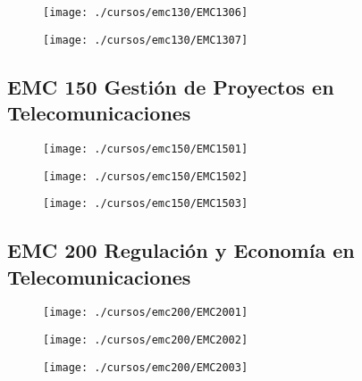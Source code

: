 \begin{figure}[!ht]
    \centering
    \texttt{[image: ./cursos/emc130/EMC1306]}
\end{figure}
\clearpage

\begin{figure}[!ht]
    \centering
    \texttt{[image: ./cursos/emc130/EMC1307]}
\end{figure}
\clearpage



\subsection{EMC 150 Gestión de Proyectos en Telecomunicaciones} 



\begin{figure}[!ht]
    \centering
    \texttt{[image: ./cursos/emc150/EMC1501]}
\end{figure}
\clearpage

\begin{figure}[!ht]
    \centering
    \texttt{[image: ./cursos/emc150/EMC1502]}
\end{figure}
\clearpage

\begin{figure}[!ht]
    \centering
    \texttt{[image: ./cursos/emc150/EMC1503]}
\end{figure}
\clearpage


\subsection{EMC 200 Regulación y Economía en Telecomunicaciones}




\begin{figure}[!ht]
    \centering
    \texttt{[image: ./cursos/emc200/EMC2001]}
\end{figure}
\clearpage

\begin{figure}[!ht]
    \centering
    \texttt{[image: ./cursos/emc200/EMC2002]}
\end{figure}
\clearpage

\begin{figure}[!ht]
    \centering
    \texttt{[image: ./cursos/emc200/EMC2003]}
\end{figure}
\clearpage

